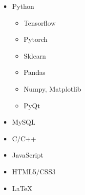 \documentclass[10pt,a4paper,sans]{moderncv} %
\begin{document}
	\begin{cvcolumns}
		{
			\vspace{-2em}
			\begin{multicols}{2}
				\begin{itemize}
					\item Python
					\begin{itemize}
						\item Tensorflow
                        \item Pytorch
						\item Sklearn
						\item Pandas
                        \item Numpy, Matplotlib
                        \item PyQt
					\end{itemize}
					\item MySQL
					\item C/C++
					\item JavaScript
					\item HTML5/CSS3
					\item \LaTeX
				\end{itemize}
			\end{multicols}
		}
		
		
	\end{cvcolumns}
	
\end{document}
